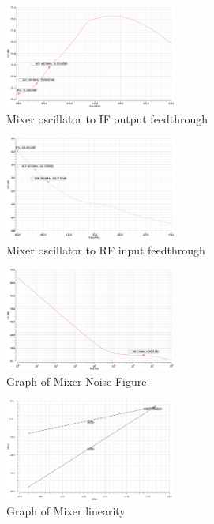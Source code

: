 \begin{figure}[h]
   \centering
    \includegraphics[width=0.5\textwidth]{figures/MixerLO-IFfeed.png}
    \caption{Mixer oscillator to IF output feedthrough}
    \label{fig:loif}
\end{figure}

\begin{figure}[h]
   \centering
    \includegraphics[width=0.5\textwidth]{figures/MixerLO-RFfeed.png}
    \caption{Mixer oscillator to RF input feedthrough}
    \label{fig:lorf}
\end{figure}

\begin{figure}[h]
   \centering
    \includegraphics[width=0.5\textwidth]{figures/MixerNoiseFigure.png}
    \caption{Graph of Mixer Noise Figure}
    \label{fig:mixernoise}
\end{figure}

\begin{figure}[h]
   \centering
    \includegraphics[width=0.5\textwidth]{figures/mixerIIP3.png}
    \caption{Graph of Mixer linearity}
    \label{fig:mixerlin}
\end{figure}

